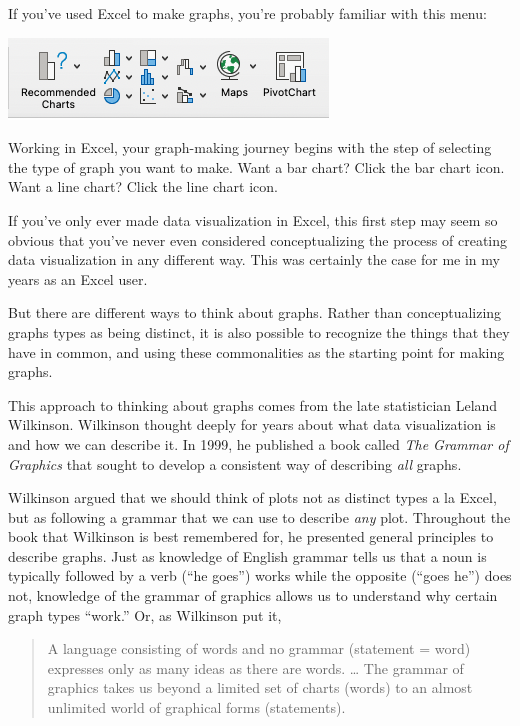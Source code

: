 \documentclass[
]{book}
\begin{document}
If you've used Excel to make graphs, you're probably familiar with this menu:

\includegraphics[width=1\linewidth]{assets/excel-chart-chooser}

Working in Excel, your graph-making journey begins with the step of selecting the type of graph you want to make. Want a bar chart? Click the bar chart icon. Want a line chart? Click the line chart icon.

If you've only ever made data visualization in Excel, this first step may seem so obvious that you've never even considered conceptualizing the process of creating data visualization in any different way. This was certainly the case for me in my years as an Excel user.

But there are different ways to think about graphs. Rather than conceptualizing graphs types as being distinct, it is also possible to recognize the things that they have in common, and using these commonalities as the starting point for making graphs.

This approach to thinking about graphs comes from the late statistician Leland Wilkinson. Wilkinson thought deeply for years about what data visualization is and how we can describe it. In 1999, he published a book called \emph{The Grammar of Graphics} that sought to develop a consistent way of describing \emph{all} graphs.

Wilkinson argued that we should think of plots not as distinct types a la Excel, but as following a grammar that we can use to describe \emph{any} plot. Throughout the book that Wilkinson is best remembered for, he presented general principles to describe graphs. Just as knowledge of English grammar tells us that a noun is typically followed by a verb (``he goes'') works while the opposite (``goes he'') does not, knowledge of the grammar of graphics allows us to understand why certain graph types ``work.'' Or, as Wilkinson put it,

\begin{quote}
A language consisting of words and no grammar (statement = word) expresses only as many ideas as there are words. \ldots{} The grammar of graphics takes us beyond a limited set of charts (words) to an almost unlimited world of graphical forms (statements).
\end{quote}
\end{document}
